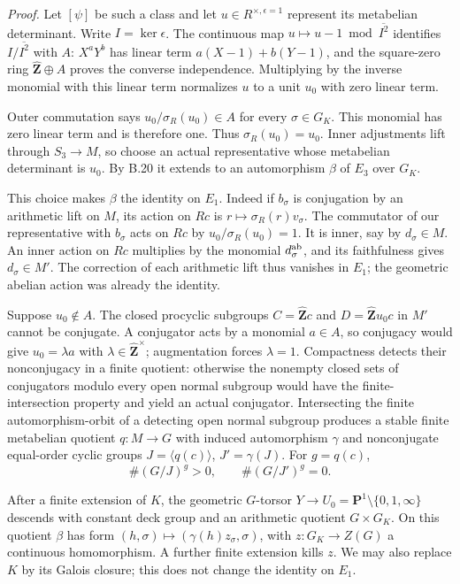 \emph{Proof.}
Let $[\psi]$ be such a class and let $u\in R^{\times,\epsilon=1}$
represent its metabelian determinant. Write $I=\ker\epsilon$.
The continuous map $u\mapsto u-1\bmod\overline{I^2}$ identifies
$I/\overline{I^2}$ with $A$: $X^aY^b$ has linear term
$a(X-1)+b(Y-1)$, and the square-zero ring
$\widehat{\mathbf Z}\oplus A$ proves the converse independence.
Multiplying by the inverse monomial with this linear term
normalizes $u$ to a unit $u_0$ with zero linear term.

Outer commutation says $u_0/\sigma_R(u_0)\in A$ for every
$\sigma\in G_K$. This monomial has zero linear term and is
therefore one. Thus $\sigma_R(u_0)=u_0$. Inner adjustments lift
through $S_3\to M$, so choose an actual representative whose
metabelian determinant is $u_0$. By B.20 it extends to an
automorphism $\beta$ of $E_3$ over $G_K$.

This choice makes $\beta$ the identity on $E_1$. Indeed if
$b_\sigma$ is conjugation by an arithmetic lift on $M$, its
action on $Rc$ is $r\mapsto\sigma_R(r)v_\sigma$. The commutator
of our representative with $b_\sigma$ acts on $Rc$ by
$u_0/\sigma_R(u_0)=1$. It is inner, say by $d_\sigma\in M$.
An inner action on $Rc$ multiplies by the monomial
$d_\sigma^{\rm ab}$, and its faithfulness gives $d_\sigma\in M'$.
The correction of each arithmetic lift thus vanishes in $E_1$;
the geometric abelian action was already the identity.

Suppose $u_0\notin A$. The closed procyclic subgroups
$C=\widehat{\mathbf Z}c$ and $D=\widehat{\mathbf Z}u_0c$ in
$M'$ cannot be conjugate. A conjugator acts by a monomial
$a\in A$, so conjugacy would give $u_0=\lambda a$ with
$\lambda\in\widehat{\mathbf Z}^{\times}$; augmentation forces
$\lambda=1$. Compactness detects their nonconjugacy in a
finite quotient: otherwise the nonempty closed sets of
conjugators modulo every open normal subgroup would have
the finite-intersection property and yield an actual conjugator.
Intersecting the finite automorphism-orbit of a detecting
open normal subgroup produces a stable finite metabelian
quotient $q:M\to G$ with induced automorphism $\gamma$ and
nonconjugate equal-order cyclic groups
$J=\langle q(c)\rangle$, $J'=\gamma(J)$. For $g=q(c)$,
\[
             \#(G/J)^g>0,\qquad \#(G/J')^g=0.
\]

After a finite extension of $K$, the geometric $G$-torsor
$Y\to U_0=\mathbf P^1\setminus\{0,1,\infty\}$ descends with
constant deck group and an arithmetic quotient $G\times G_K$.
On this quotient $\beta$ has form
$(h,\sigma)\mapsto(\gamma(h)z_\sigma,\sigma)$, with
$z:G_K\to Z(G)$ a continuous homomorphism. A further finite
extension kills $z$. We may also replace $K$ by its Galois
closure; this does not change the identity on $E_1$.

